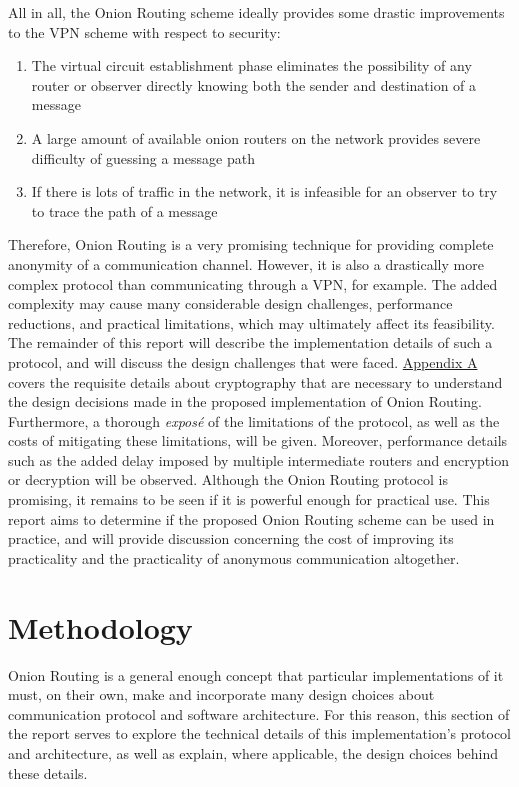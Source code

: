 \documentclass[10pt]{report}
\begin{document}
All in all, the Onion Routing scheme ideally provides some drastic improvements to the VPN scheme
with respect to security:
\begin{enumerate}
    \item The virtual circuit establishment phase eliminates the possibility of any router or
        observer directly knowing both the sender and destination of a message
    \item A large amount of available onion routers on the network provides severe difficulty of
        guessing a message path
    \item If there is lots of traffic in the network, it is infeasible for an observer to try to
        trace the path of a message
\end{enumerate}
Therefore, Onion Routing is a very promising technique for providing complete anonymity of a
communication channel. However, it is also a drastically more complex protocol than communicating
through a VPN, for example. The added complexity may cause many considerable design challenges,
performance reductions, and practical limitations, which may ultimately affect its feasibility.\\

The remainder of this report will describe the implementation details of such a protocol, and will
discuss the design challenges that were faced. \hyperref[crypto]{Appendix A} covers the requisite
details about cryptography that are necessary to understand the design decisions made in the
proposed implementation of Onion Routing. Furthermore, a thorough \textit{expos\'e} of the
limitations of the protocol, as well as the costs of mitigating these limitations, will be given.
Moreover, performance details such as the added delay imposed by multiple intermediate routers and
encryption or decryption will be observed. Although the Onion Routing protocol is promising, it
remains to be seen if it is powerful enough for practical use. This report aims to determine if the
proposed Onion Routing scheme can be used in practice, and will provide discussion concerning the
cost of improving its practicality and the practicality of anonymous communication altogether.


\chapter{Methodology}
Onion Routing is a general enough concept that particular implementations of it must, on
their own, make and incorporate many design choices about communication protocol and software
architecture.  For this reason, this section of the report serves to explore the technical
details of this implementation's protocol and architecture, as well as explain, where
applicable, the design choices behind these details.
\end{document}
